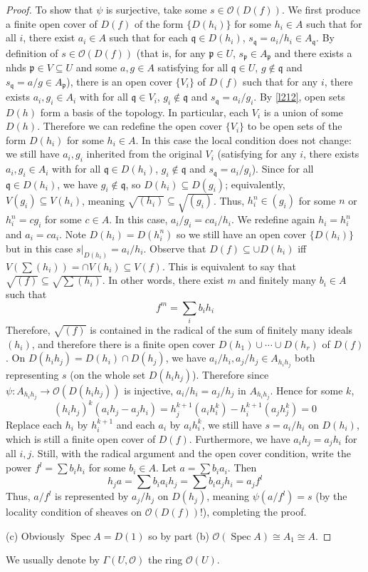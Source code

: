 \documentclass[12pt]{article}
\theoremstyle{remark}
\newcommand{\Spec}[0]{\operatorname{Spec}}
\begin{document}
\begin{proof}
	To show that $\psi$ is surjective, take some $s\in \mathscr O(D(f))$. We first produce a finite open cover of $D(f)$ of the form $\{D(h_i)\}$ for some $h_i\in A$ such that for all $i$, there exist $a_i\in A$ such that for each $\mathfrak q\in D(h_i)$, $s_{\mathfrak q}=a_i/h_i\in A_{\mathfrak q}$. By definition of $s\in \mathscr O(D(f))$ (that is, for any $\mathfrak p\in U$, $s_{\mathfrak p}\in A_{\mathfrak p}$ and there exists a nhds $\mathfrak p\in V\subseteq U$ and some $a, g\in A$ satisfying for all $\mathfrak q\in U$, $g\notin \mathfrak q$ and $s_{\mathfrak q}= a/g\in A_{\mathfrak p}$), there is an open cover $\{V_i\}$ of $D(f)$ such that for any $i$, there exists $a_i, g_i\in A_i$ with for all $\mathfrak q\in V_i$, $g_i\notin \mathfrak q$ and $s_{\mathfrak q}=a_i/g_i$. By \autoref{l212}, open sets $D(h)$ form a basis of the topology. In particular, each $V_i$ is a union of some $D(h)$. Therefore we can redefine the open cover $\{V_i\}$ to be open sets of the form $D(h_i)$ for some $h_i\in A$. In this case the local condition does not change: we still have $a_i, g_i$ inherited from the original $V_i$ (satisfying for any $i$, there exists $a_i, g_i\in A_i$ with for all $\mathfrak q\in D(h_i)$, $g_i\notin \mathfrak q$ and $s_{\mathfrak q}=a_i/g_i$). Since for all $\mathfrak q\in D(h_i)$, we have $g_i\notin \mathfrak q$, so $D(h_i)\subseteq D(g_i)$; equivalently, $V(g_i)\subseteq V(h_i)$, meaning $\sqrt{(h_i)}\subseteq\sqrt{(g_i)}$. Thus, $h_i^n\in (g_i)$ for some $n$ or $h_i^n=cg_i$ for some $c\in A$. In this case, $a_i/g_i=ca_i/h_i$. We redefine again $h_i=h_i^n$ and $a_i=ca_i$. Note $D(h_i)=D(h_i^n)$ so we still have an open cover $\{D(h_i)\}$ but in this case $s|_{D(h_i)}=a_i/h_i$. Observe that $D(f)\subseteq \cup D(h_i)$ iff $V(\sum (h_i))=\cap V(h_i)\subseteq V(f)$. This is equivalent to say that $\sqrt{(f)}\subseteq \sqrt{\sum (h_i)}$. In other words, there exist $m$ and finitely many $b_i\in A$ such that
	\[f^m=\sum_i b_ih_i\]
	Therefore, $\sqrt{(f)}$ is contained in the radical of the sum of finitely many ideals $(h_i)$, and therefore there is a finite open cover $D(h_1)\cup\cdots\cup D(h_r)$ of $D(f)$. On $D(h_ih_j)=D(h_i)\cap D(h_j)$, we have $a_i/h_i, a_j/h_j\in A_{h_ih_j}$ both representing $s$ (on the whole set $D(h_ih_j)$). Therefore since $\psi: A_{h_ih_j}\to \mathscr O(D(h_ih_j))$ is injective, $a_i/h_i=a_j/h_j$ in $A_{h_ih_j}$. Hence for some $k$,
	\[(h_ih_j)^k(a_ih_j-a_jh_i)=h_j^{k+1}(a_ih_i^k)-h_i^{k+1}(a_jh_j^k)=0\]
	Replace each $h_i$ by $h_i^{k+1}$ and each $a_i$ by $a_ih_i^k$, we still have $s=a_i/h_i$ on $D(h_i)$, which is still a finite open cover of $D(f)$. Furthermore, we have $a_ih_j=a_jh_i$ for all $i, j$. Still, with the radical argument and the open cover condition, write the power $f^l=\sum b_ih_i$ for some $b_i\in A$. Let $a=\sum b_ia_i$. Then
	\[h_ja=\sum b_ia_ih_j=\sum b_ia_jh_i=a_jf^l\]
	Thus, $a/f^l$ is represented by $a_j/h_j$ on $D(h_j)$, meaning $\psi(a/f^l)=s$ (by the locality condition of sheaves on $\mathscr O(D(f))$!), completing the proof.
	
	(c) Obviously $\Spec A=D(1)$ so by part (b) $\mathscr O(\Spec A)\cong A_1\cong A$.
	\end{proof}
	We usually denote by $\Gamma(U, \mathscr O)$ the ring $\mathscr O(U)$.
\end{document}
